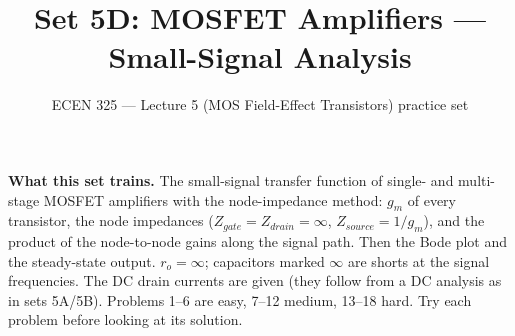 \documentclass[11pt]{article}
\title{Set 5D: MOSFET Amplifiers --- Small-Signal Analysis}
\author{ECEN 325 --- Lecture 5 (MOS Field-Effect Transistors) practice set}
\date{}
\begin{document}
\maketitle

\textbf{What this set trains.} The small-signal transfer function of single- and multi-stage MOSFET amplifiers with
the node-impedance method: $g_m$ of every transistor, the node impedances ($Z_{gate} = Z_{drain} = \infty$,
$Z_{source} = 1/g_m$), and the product of the node-to-node gains along the signal path. Then the Bode plot and the
steady-state output. $r_o = \infty$; capacitors marked $\infty$ are shorts at the signal frequencies. The DC drain
currents are given (they follow from a DC analysis as in sets 5A/5B). Problems 1--6 are easy, 7--12 medium, 13--18
hard. Try each problem before looking at its solution.
\end{document}

